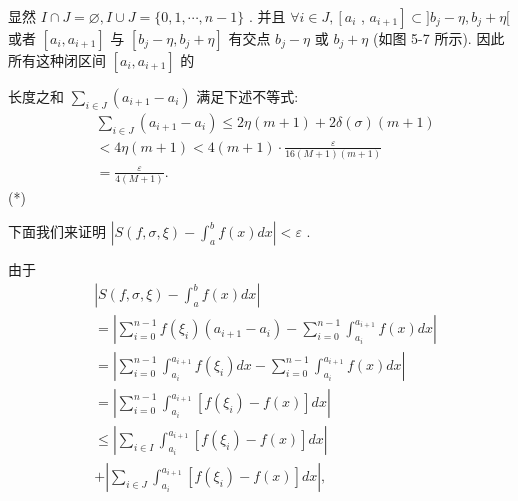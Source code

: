 显然 $I \cap  J = \varnothing ,I \cup  J = \{ 0,1,\cdots ,n - 1\}$ . 并且 $\forall i \in  J,\left\lbrack  {a}_{i}\right.$ , $\left. {a}_{i + 1}\right\rbrack   \subset  \rbrack {b}_{j} - \eta ,{b}_{j} + \eta \lbrack$ 或者 $\left\lbrack  {{a}_{i},{a}_{i + 1}}\right\rbrack$ 与 $\left\lbrack  {{b}_{j} - \eta ,{b}_{j} + \eta }\right\rbrack$ 有交点 ${b}_{j} - \eta$ 或 ${b}_{j} + \eta$ (如图 5-7 所示). 因此所有这种闭区间 $\left\lbrack  {{a}_{i},{a}_{i + 1}}\right\rbrack$ 的

长度之和 $\mathop{\sum }\limits_{{i \in  J}}\left( {{a}_{i + 1} - {a}_{i}}\right)$ 满足下述不等式:
\begin{align*}
	&\mathop{\sum }\limits_{{i \in  J}}\left( {{a}_{i + 1} - {a}_{i}}\right)  \leq  {2\eta }\left( {m + 1}\right)  + {2\delta }\left( \sigma \right) \left( {m + 1}\right)\\
	&< {4\eta }\left( {m + 1}\right)  < 4\left( {m + 1}\right)  \cdot  \frac{\varepsilon }{{16}\left( {M + 1}\right) \left( {m + 1}\right) }\\
	&= \frac{\varepsilon }{4\left( {M + 1}\right) }.
\end{align*}
(*)

下面我们来证明 $\left| {S\left( {f,\sigma ,\xi }\right)  - {\int }_{a}^{b}f\left( x\right) {dx}}\right|  < \varepsilon$ .

由于
\begin{align*}
	&\left| {S\left( {f,\sigma ,\xi }\right)  - {\int }_{a}^{b}f\left( x\right) {dx}}\right|\\
	&= \left| {\mathop{\sum }\limits_{{i = 0}}^{{n - 1}}f\left( {\xi }_{i}\right) \left( {{a}_{i + 1} - {a}_{i}}\right)  - \mathop{\sum }\limits_{{i = 0}}^{{n - 1}}{\int }_{{a}_{i}}^{{a}_{i + 1}}f\left( x\right) {dx}}\right|\\
	&= \left| {\mathop{\sum }\limits_{{i = 0}}^{{n - 1}}{\int }_{{a}_{i}}^{{a}_{i + 1}}f\left( {\xi }_{i}\right) {dx} - \mathop{\sum }\limits_{{i = 0}}^{{n - 1}}{\int }_{{a}_{i}}^{{a}_{i + 1}}f\left( x\right) {dx}}\right|\\
	&= \left| {\mathop{\sum }\limits_{{i = 0}}^{{n - 1}}{\int }_{{a}_{i}}^{{a}_{i + 1}}\left\lbrack  {f\left( {\xi }_{i}\right)  - f\left( x\right) }\right\rbrack  {dx}}\right|\\
	&\leq  \left| {\mathop{\sum }\limits_{{i \in  I}}{\int }_{{a}_{i}}^{{a}_{i + 1}}\left\lbrack  {f\left( {\xi }_{i}\right)  - f\left( x\right) }\right\rbrack  {dx}}\right|\\
	&+ \left| {\mathop{\sum }\limits_{{i \in  J}}{\int }_{{a}_{i}}^{{a}_{i + 1}}\left\lbrack  {f\left( {\xi }_{i}\right)  - f\left( x\right) }\right\rbrack  {dx}}\right| ,
\end{align*}

